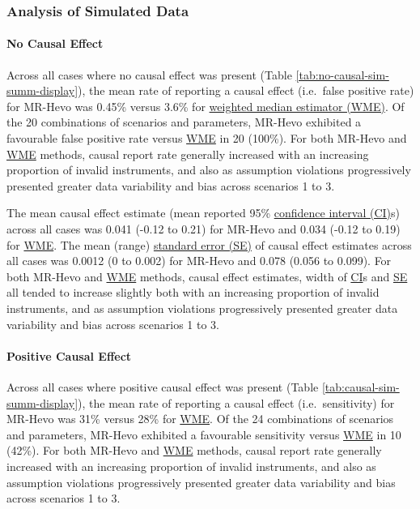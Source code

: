 \documentclass[
]{article}
\begin{document}
\newpage

\subsubsection{Analysis of Simulated Data}\label{analysis-of-simulated-data}

\paragraph{No Causal Effect}\label{no-causal-effect}

\leavevmode\newline Across all cases where no causal effect was present (Table \ref{tab:no-causal-sim-summ-display}), the mean rate of reporting a causal effect (i.e.~false positive rate) for MR-Hevo was 0.45\% versus 3.6\% for \hyperref[acronyms_WME]{weighted median estimator (WME)}. Of the 20 combinations of scenarios and parameters, MR-Hevo exhibited a favourable false positive rate versus \hyperref[acronyms_WME]{WME} in 20 (100\%). For both MR-Hevo and \hyperref[acronyms_WME]{WME} methods, causal report rate generally increased with an increasing proportion of invalid instruments, and also as assumption violations progressively presented greater data variability and bias across scenarios 1 to 3.

The mean causal effect estimate (mean reported 95\% \hyperref[acronyms_CI]{confidence interval (CI)}s) across all cases was 0.041 (-0.12 to 0.21) for MR-Hevo and 0.034 (-0.12 to 0.19) for \hyperref[acronyms_WME]{WME}. The mean (range) \hyperref[acronyms_SE]{standard error (SE)} of causal effect estimates across all cases was 0.0012 (0 to 0.002) for MR-Hevo and 0.078 (0.056 to 0.099). For both MR-Hevo and \hyperref[acronyms_WME]{WME} methods, causal effect estimates, width of \hyperref[acronyms_CI]{CI}s and \hyperref[acronyms_SE]{SE} all tended to increase slightly both with an increasing proportion of invalid instruments, and as assumption violations progressively presented greater data variability and bias across scenarios 1 to 3.

\paragraph{Positive Causal Effect}\label{positive-causal-effect}

\leavevmode\newline Across all cases where positive causal effect was present (Table \ref{tab:causal-sim-summ-display}), the mean rate of reporting a causal effect (i.e.~sensitivity) for MR-Hevo was 31\% versus 28\% for \hyperref[acronyms_WME]{WME}. Of the 24 combinations of scenarios and parameters, MR-Hevo exhibited a favourable sensitivity versus \hyperref[acronyms_WME]{WME} in 10 (42\%). For both MR-Hevo and \hyperref[acronyms_WME]{WME} methods, causal report rate generally increased with an increasing proportion of invalid instruments, and also as assumption violations progressively presented greater data variability and bias across scenarios 1 to 3.
\end{document}
